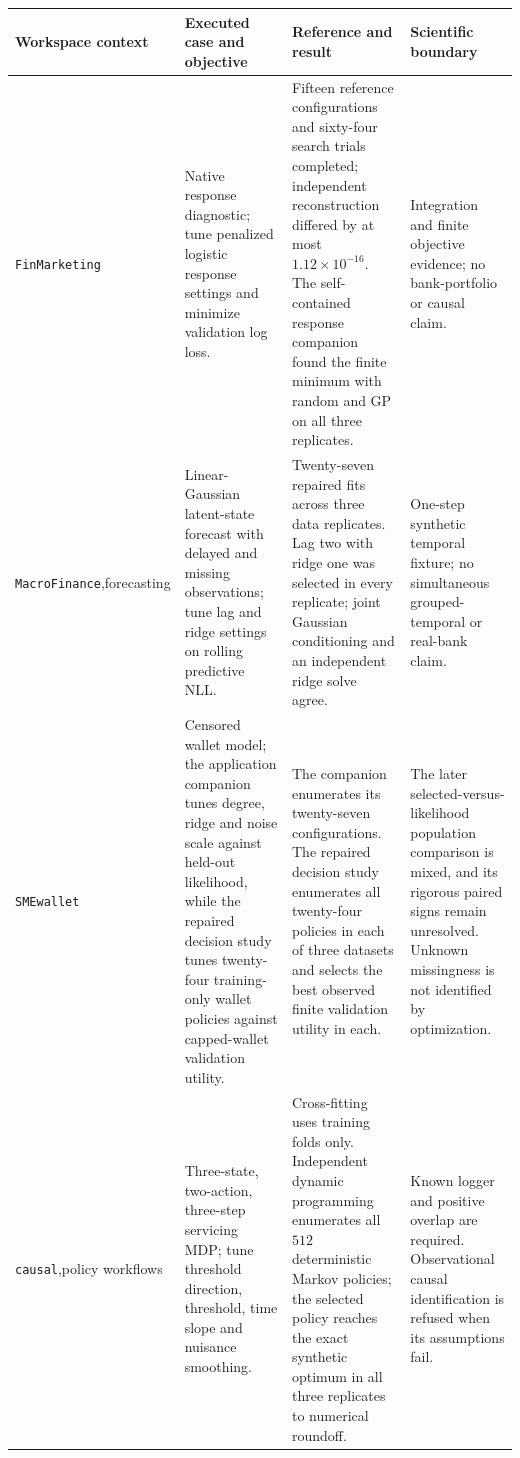 \begin{longtable}{p{}p{}p{}p{}}
\toprule
Workspace context & Executed case and objective & Reference and result & Scientific boundary\\
\midrule
\texttt{FinMarketing} & Native response diagnostic; tune penalized logistic response settings and minimize validation log loss. & Fifteen reference configurations and sixty-four search trials completed; independent reconstruction differed by at most $1.12\times10^{-16}$. The self-contained response companion found the finite minimum with random and GP on all three replicates. & Integration and finite objective evidence; no bank-portfolio or causal claim.\\
\texttt{MacroFinance},\newline forecasting & Linear-Gaussian latent-state forecast with delayed and missing observations; tune lag and ridge settings on rolling predictive NLL. & Twenty-seven repaired fits across three data replicates. Lag two with ridge one was selected in every replicate; joint Gaussian conditioning and an independent ridge solve agree. & One-step synthetic temporal fixture; no simultaneous grouped-temporal or real-bank claim.\\
\texttt{SMEwallet} & Censored wallet model; the application companion tunes degree, ridge and noise scale against held-out likelihood, while the repaired decision study tunes twenty-four training-only wallet policies against capped-wallet validation utility. & The companion enumerates its twenty-seven configurations. The repaired decision study enumerates all twenty-four policies in each of three datasets and selects the best observed finite validation utility in each. & The later selected-versus-likelihood population comparison is mixed, and its rigorous paired signs remain unresolved. Unknown missingness is not identified by optimization.\\
\texttt{causal},\newline policy workflows & Three-state, two-action, three-step servicing MDP; tune threshold direction, threshold, time slope and nuisance smoothing. & Cross-fitting uses training folds only. Independent dynamic programming enumerates all $512$ deterministic Markov policies; the selected policy reaches the exact synthetic optimum in all three replicates to numerical roundoff. & Known logger and positive overlap are required. Observational causal identification is refused when its assumptions fail.\\

\end{longtable}
